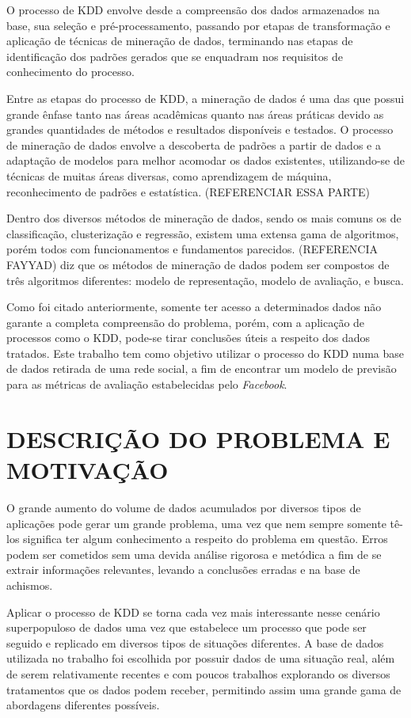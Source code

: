 O processo de KDD envolve desde a compreensão dos dados armazenados na base, sua seleção e pré-processamento, passando por etapas de transformação e aplicação de técnicas de mineração de dados, terminando nas etapas de identificação dos padrões gerados que se enquadram nos requisitos de conhecimento do processo.

Entre as etapas do processo de KDD, a mineração de dados é uma das que possui grande ênfase tanto nas áreas acadêmicas quanto nas áreas práticas devido as grandes quantidades de métodos e resultados disponíveis e testados. O processo de mineração de dados envolve a descoberta de padrões a partir de dados e a adaptação de modelos para melhor acomodar os dados existentes, utilizando-se de técnicas de muitas áreas diversas, como aprendizagem de máquina, reconhecimento de padrões e estatística. (REFERENCIAR ESSA PARTE)

Dentro dos diversos métodos de mineração de dados, sendo os mais comuns os de classificação, clusterização e regressão, existem uma extensa gama de algoritmos, porém todos com funcionamentos e fundamentos parecidos. (REFERENCIA FAYYAD) diz que os métodos de mineração de dados podem ser compostos de três algoritmos diferentes: modelo de representação, modelo de avaliação, e busca.
	
Como foi citado anteriormente, somente ter acesso a determinados dados não garante a completa compreensão do problema, porém, com a aplicação de processos como o KDD, pode-se tirar conclusões úteis a respeito dos dados tratados. Este trabalho tem como objetivo utilizar o processo do KDD numa base de dados retirada de uma rede social, a fim de encontrar um modelo de previsão para as métricas de avaliação estabelecidas pelo \textit{Facebook}.

\section{DESCRIÇÃO DO PROBLEMA E MOTIVAÇÃO}
\label{sec:descricaomotivacao}

O grande aumento do volume de dados acumulados por diversos tipos de aplicações pode gerar um grande problema, uma vez que nem sempre somente tê-los significa ter algum conhecimento a respeito do problema em questão. Erros podem ser cometidos sem uma devida análise rigorosa e metódica a fim de se extrair informações relevantes, levando a conclusões erradas e na base de achismos.

Aplicar o processo de KDD se torna cada vez mais interessante nesse cenário superpopuloso de dados uma vez que estabelece um processo que pode ser seguido e replicado em diversos tipos de situações diferentes. A base de dados utilizada no trabalho foi escolhida por possuir dados de uma situação real, além de serem relativamente recentes e com poucos trabalhos explorando os diversos tratamentos que os dados podem receber, permitindo assim uma grande gama de abordagens diferentes possíveis.


